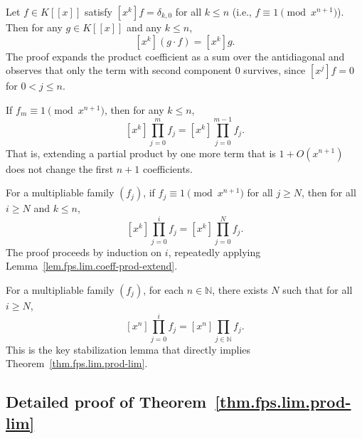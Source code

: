 \begin{lemma}
\label{lem.fps.lim.coeff-mul-one-plus-higher}
\leanhelper
\leanok
Let $f \in K[[x]]$ satisfy $[x^k] f = \delta_{k,0}$ for all
$k \le n$ (i.e., $f \equiv 1 \pmod{x^{n+1}}$). Then for any
$g \in K[[x]]$ and any $k \le n$,
\[
[x^k](g \cdot f) = [x^k] g.
\]
The proof expands the product coefficient as a sum over the antidiagonal
and observes that only the term with second component $0$ survives,
since $[x^j] f = 0$ for $0 < j \le n$.
\end{lemma}

\begin{lemma}
\label{lem.fps.lim.coeff-prod-extend}
\leanhelper
\leanok
If $f_m \equiv 1 \pmod{x^{n+1}}$, then for any $k \le n$,
\[
[x^k] \prod_{j=0}^{m} f_j = [x^k] \prod_{j=0}^{m-1} f_j.
\]
That is, extending a partial product by one more term that is
$1 + O(x^{n+1})$ does not change the first $n+1$ coefficients.
\end{lemma}

\begin{lemma}
\label{lem.fps.lim.coeff-prod-range-eq-of-ge}
\leanhelper
\leanok
For a multipliable family $(f_j)$, if $f_j \equiv 1 \pmod{x^{n+1}}$
for all $j \ge N$, then for all $i \ge N$ and $k \le n$,
\[
[x^k] \prod_{j=0}^{i} f_j = [x^k] \prod_{j=0}^{N} f_j.
\]
The proof proceeds by induction on $i$, repeatedly applying
Lemma~\ref{lem.fps.lim.coeff-prod-extend}.
\end{lemma}

\begin{lemma}
\label{lem.fps.lim.coeff-partial-prod-stabilizes}
\leanhelper
\leanok
For a multipliable family $(f_j)$, for each $n \in \mathbb{N}$,
there exists $N$ such that for all $i \ge N$,
\[
[x^n] \prod_{j=0}^{i} f_j = [x^n] \prod_{j\in\mathbb{N}} f_j.
\]
This is the key stabilization lemma that directly implies
Theorem~\ref{thm.fps.lim.prod-lim}.
\end{lemma}

\subsection{Detailed proof of Theorem~\ref{thm.fps.lim.prod-lim}}


